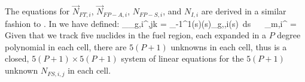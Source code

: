 %
The equations for $\vec{N}_{FT,i}$, $\vec{N}_{FP-A,i}$, $N_{FP-S,i}$, and $N_{I,i}$ are derived in a similar fashion to .  
In  we have defined:
\benum
\Mw_{\phi_{g,i}^{\tau},jk} = \int_{-1}^{1}{(s)(s)\widetilde{\phi}_{g,\tau,i}(s)~ds} ~~
\label{eq:mw_mat}
\eenum
\benum
{}_{m,i}^{\tau} = 
 \pep
\eenum
Given that we track five nuclides in the fuel region, each expanded in a $P$ degree polynomial in each cell, there are $5(P+1)$ unknowns in each cell, thus  is a closed, $5(P+1) \times 5(P+1)$ system of linear equations for the $5(P+1)$ unknown $N_{FS,i,j}$ in each cell.
